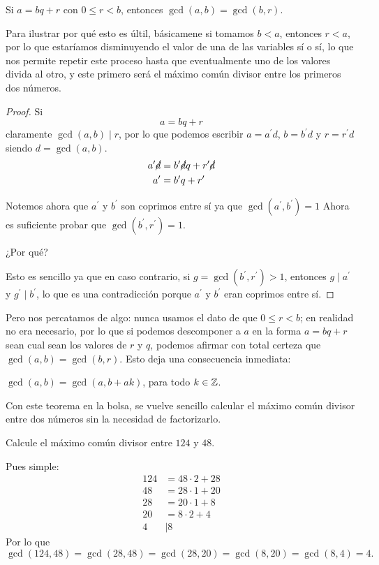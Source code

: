 \begin{theorem}
	Si $a = bq + r$ con $0 \leq r < b$,
	entonces $\gcd (a, b) = \gcd (b, r)$.
\end{theorem}

Para ilustrar por qué esto es últil,
básicamene si tomamos $b < a$, entonces
$r < a$, por lo que estaríamos disminuyendo
el valor de una de las variables sí o sí,
lo que nos permite repetir este
proceso hasta que eventualmente uno de los
valores divida al otro, y este primero
será el máximo común divisor entre los primeros
dos números.

\begin{proof}
	Si
	\[a = bq + r\]
	claramente $\gcd (a, b) \mid r$,
	por lo que podemos escribir $a = a^\prime d$,
	$b = b^\prime d$ y $r = r^\prime d$
	siendo $d = \gcd (a, b)$.
	\begin{align*}
		a^\prime \cancel {d} & = b^\prime \cancel{d}q + r^\prime \cancel{d} \\
		a^\prime             & = b^\prime q + r^\prime
	\end{align*}

	Notemos ahora que $a^\prime$
	y $b^\prime$ son coprimos entre sí
	ya que $\gcd(a^\prime, b^\prime) = 1$
	Ahora es suficiente probar que $\gcd (b^\prime, r^\prime) = 1$.
	\begin{question*}
		¿Por qué?
	\end{question*}

	Esto es sencillo ya que en caso contrario,
	si $g = \gcd (b^\prime, r^\prime) > 1$, entonces
	$g \mid a^\prime$ y $g^\prime \mid b^\prime$,
	lo que es una contradicción porque
	$a^\prime$ y $b^\prime$ eran coprimos entre sí.
\end{proof}

Pero nos percatamos de algo:
nunca usamos el dato de que
$0 \leq r < b$; en realidad no era
necesario, por lo que si podemos
descomponer a $a$ en la forma
$a = bq + r$ sean cual sean
los valores de $r$ y $q$,
podemos afirmar con total certeza que
$\gcd(a, b) = \gcd (b, r)$.
Esto deja una consecuencia inmediata:
\begin{corollary}
	$\gcd(a, b) = \gcd(a, b + ak)$, para todo $k \in \mathbb Z$.
\end{corollary}

Con este teorema en la bolsa, se vuelve
sencillo calcular el máximo común divisor
entre dos números sin la necesidad de factorizarlo.

\begin{example}
	Calcule el máximo común divisor entre
	$124$ y $48$.
\end{example}
Pues simple:
\begin{align*}
	124 & = 48 \cdot 2 + 28 \\
	48  & = 28 \cdot 1 + 20 \\
	28  & = 20 \cdot 1 + 8  \\
	20  & = 8 \cdot 2 + 4   \\
	4   & \mid 8
\end{align*}
Por lo que
\[\gcd (124, 48) = \gcd(28, 48) = \gcd(28, 20) = \gcd(8, 20) = \gcd(8, 4) = 4.\]


